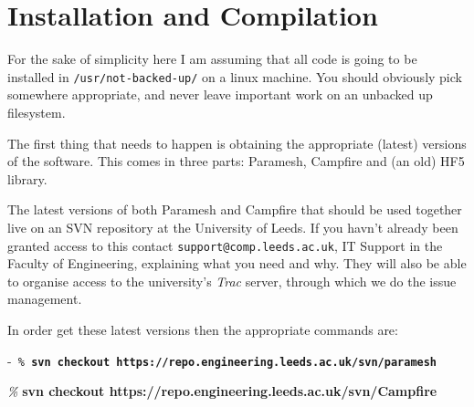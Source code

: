 \documentclass[paper=a4, fontsize=11pt,twoside,bibtotoc]{scrartcl}		%
\newenvironment{codebox}{\begin{center}\begin{MakeFramed}{\hsize0.99\linewidth\advance\hsize-\width\FrameRestore}\tt}{\end{MakeFramed}\end{center}}
\newcommand{\prompt}[1]{\textsl{\%} \textbf{#1}}
\newcommand{\exclude}[1]{}
\begin{document}

\section{Installation and Compilation}
								\label{SEC_Compiling}

\exclude{        Make Paramesh with "make -f Makefile.Intel".
        You may need to tweak some directories in various Makefile places 
        for these.

HDF5

        http://www.hdfgroup.org/ftp/HDF5/prev-releases/hdf5-1.6.10/src/

        Configure with

                ./configure --enable-parallel
--prefix=/usr/not-backed-up/PHASEFIELD/hdf5-1.6.10 CC=mpicc F90=mpif90

        (with appropriately named prefix address)

Paramesh documentation:

        http://www.physics.drexel.edu/~olson/paramesh-doc/Users_manual/amr.html
}


For the sake of simplicity here I am assuming that all code is going to be installed in \texttt{/usr/not-backed-up/} on a linux machine.  You should obviously 
pick somewhere appropriate, and never leave important work on an unbacked up filesystem.

The first thing that needs to happen is obtaining the appropriate (latest) versions of the software.  This comes in three parts: Paramesh, Campfire and (an old) 
HF5 library.

The latest versions of both Paramesh and Campfire that should be used together live on an SVN repository at the University of Leeds.  If you havn't already been 
granted access to this contact \texttt{support@comp.leeds.ac.uk}, IT Support in the Faculty of Engineering, explaining what 
you need and why.  They will also be able to organise access to the university's \textsl{Trac} server,  through which we do the issue management.

In order get these latest versions then the appropriate commands are:

\begin{codebox}
        \prompt{svn checkout https://repo.engineering.leeds.ac.uk/svn/paramesh}

        \prompt{svn checkout https://repo.engineering.leeds.ac.uk/svn/Campfire}
\end{codebox}
\end{document}
